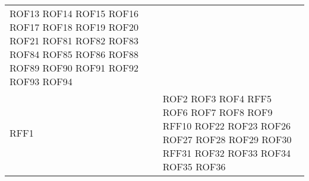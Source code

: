 \documentclass[../DefinizioneDiProdotto_v2.0.0.tex]{subfiles}
\begin{document}
\begin{longtable}{p{8.5cm}!{\VRule[1pt]}p{2.5cm}}
	ROF13 \newline
	ROF14 \newline
	ROF15 \newline
	ROF16 \newline
	ROF17 \newline
	ROF18 \newline
	ROF19 \newline
	ROF20 \newline
	ROF21 \newline
	ROF81 \newline
	ROF82 \newline
	ROF83 \newline
	ROF84 \newline
	ROF85 \newline
	ROF86 \newline
	ROF88 \newline
	ROF89 \newline
	ROF90 \newline
	ROF91 \newline
	ROF92 \newline
	ROF93 \newline
	ROF94 \\
	RFF1 \newline                      & 
	ROF2 \newline
	ROF3 \newline
	ROF4 \newline
	RFF5 \newline
	ROF6 \newline
	ROF7 \newline
	ROF8 \newline
	ROF9 \newline
	RFF10 \newline
	ROF22 \newline
	ROF23 \newline
	ROF26 \newline
	ROF27 \newline
	ROF28 \newline
	ROF29 \newline
	ROF30 \newline
	RFF31 \newline
	ROF32 \newline
	ROF33 \newline
	ROF34 \newline
	ROF35 \newline
	ROF36 \newline

\end{longtable}
\end{document}
